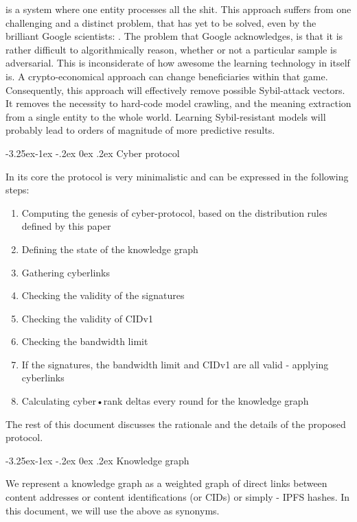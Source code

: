 \documentclass[8pt,oneside]{amsart}
\makeatletter
\newcommand{\linkgreen}[2]{\href{#1}{\color{green}{#2}}}
\renewcommand\subsection{\@startsection{subsection}{2}{\z@}%
                                     {-3.25ex\@plus -1ex \@minus -.2ex}%
                                     {0ex \@plus .2ex}%
                                     {\play\Large}}%
\newcommand{\titleSection}[1]{\subsection{#1}}
\makeatother
\begin{document}
\begin{Abstract}
\linkgreen{https://ipfs.io/ipfs/QmeS4LjoL1iMNRGuyYSx78RAtubTT2bioSGnsvoaupcHR6}{The current architecture of search engines} is a system where one entity processes all the shit. This approach suffers from one challenging and a distinct problem, that has yet to be solved, even by the brilliant Google scientists: \linkgreen{https://ipfs.io/ipfs/QmNrAFz34SLqkzhSg4wAYYJeokfJU5hBEpkT4hPRi226y9}{the adversarial example problem}. The problem that Google acknowledges, is that it is rather difficult to algorithmically reason, whether or not a particular sample is adversarial. This is inconsiderate of how awesome the learning technology in itself is. A crypto-economical approach can change beneficiaries within that game. Consequently, this approach will effectively remove possible Sybil-attack vectors. It removes the necessity to hard-code model crawling, and the meaning extraction from a single entity to the whole world. Learning Sybil-resistant models will probably lead to orders of magnitude of more predictive results.

\titleSection{Cyber protocol}\label{cyber-protocol}

In its core the protocol is very minimalistic and can be expressed in the following steps:

\begin{enumerate}[nosep]
\item Computing the genesis of cyber-protocol, based on the distribution rules defined by this paper
\item Defining the state of the knowledge graph
\item Gathering cyberlinks
\item Checking the validity of the signatures
\item Checking the validity of CIDv1
\item Checking the bandwidth limit
\item If the signatures, the bandwidth limit and CIDv1 are all valid - applying cyberlinks
\item Calculating cyber•rank deltas every round for the knowledge graph
\end{enumerate}

The rest of this document discusses the rationale and the details of the proposed protocol.

\titleSection{Knowledge graph}\label{knowledge-graph}

We represent a knowledge graph as a weighted graph of direct links between content addresses or content identifications (or CIDs) or simply - IPFS hashes. In this document, we will use the above as synonyms.


\end{Abstract}
\end{document}
